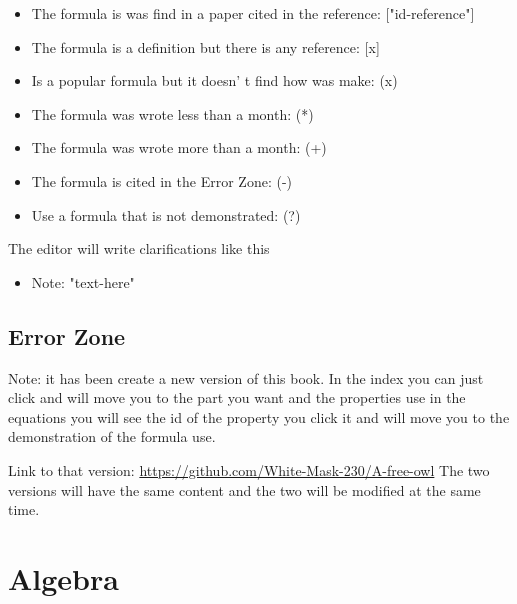 \documentclass{book}
\begin{document}
                    \begin{itemize}
                        \item The formula is was find in a paper cited in the reference: ["id-reference"]
    
                        \item The formula is a definition but there is any reference: [x]

                        \item Is a popular formula but it doesn’ t find how was make: (x)
    
                        \item The formula was wrote less than a month: (*)
    
                        \item The formula was wrote more than a month: (+)
                        
                        \item The formula is cited in the Error Zone: (-)

                        \item Use a formula that is not demonstrated: (?)
                    \end{itemize}
    
                    The editor will write clarifications like this
                    
                    \begin{itemize}
                        \item Note: "text-here"
                    \end{itemize}

        \section{Error Zone}

    Note: it has been create a new version of this book. In the index you can just click and will move you to the part you want and the properties use in the equations you will see the id of the property you click it and will move you to the demonstration of the formula use.
    
    Link to that version: \url{https://github.com/White-Mask-230/A-free-owl}
    The two versions will have the same content and the two will be modified at the same time.


    \chapter{Algebra}
\end{document}
